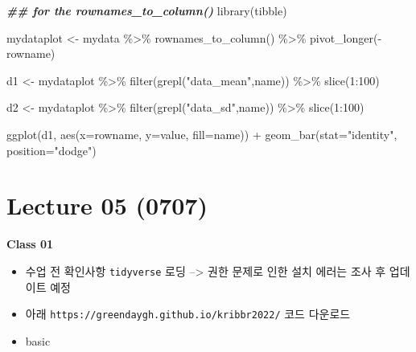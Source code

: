 \documentclass[
]{book}
\newenvironment{Shaded}{\begin{snugshade}}{\end{snugshade}}
\newcommand{\AttributeTok}[1]{\textcolor[rgb]{0.77,0.63,0.00}{#1}}
\newcommand{\DecValTok}[1]{\textcolor[rgb]{0.00,0.00,0.81}{#1}}
\newcommand{\DocumentationTok}[1]{\textcolor[rgb]{0.56,0.35,0.01}{\textbf{\textit{#1}}}}
\newcommand{\FunctionTok}[1]{\textcolor[rgb]{0.00,0.00,0.00}{#1}}
\newcommand{\NormalTok}[1]{#1}
\newcommand{\OtherTok}[1]{\textcolor[rgb]{0.56,0.35,0.01}{#1}}
\newcommand{\SpecialCharTok}[1]{\textcolor[rgb]{0.00,0.00,0.00}{#1}}
\newcommand{\StringTok}[1]{\textcolor[rgb]{0.31,0.60,0.02}{#1}}
\providecommand{\tightlist}{%
  \setlength{\itemsep}{0pt}\setlength{\parskip}{0pt}}
\begin{document}
\begin{Shaded}
\begin{Highlighting}[]
\DocumentationTok{\#\# for the rownames\_to\_column()}
\FunctionTok{library}\NormalTok{(tibble)}

\NormalTok{mydataplot }\OtherTok{\textless{}{-}}\NormalTok{ mydata }\SpecialCharTok{\%\textgreater{}\%} 
  \FunctionTok{rownames\_to\_column}\NormalTok{() }\SpecialCharTok{\%\textgreater{}\%} 
  \FunctionTok{pivot\_longer}\NormalTok{(}\SpecialCharTok{{-}}\NormalTok{rowname)}
  
\NormalTok{d1 }\OtherTok{\textless{}{-}}\NormalTok{ mydataplot }\SpecialCharTok{\%\textgreater{}\%} 
  \FunctionTok{filter}\NormalTok{(}\FunctionTok{grepl}\NormalTok{(}\StringTok{"data\_mean"}\NormalTok{,name)) }\SpecialCharTok{\%\textgreater{}\%} 
  \FunctionTok{slice}\NormalTok{(}\DecValTok{1}\SpecialCharTok{:}\DecValTok{100}\NormalTok{) }

\NormalTok{d2 }\OtherTok{\textless{}{-}}\NormalTok{ mydataplot }\SpecialCharTok{\%\textgreater{}\%} 
  \FunctionTok{filter}\NormalTok{(}\FunctionTok{grepl}\NormalTok{(}\StringTok{"data\_sd"}\NormalTok{,name)) }\SpecialCharTok{\%\textgreater{}\%} 
  \FunctionTok{slice}\NormalTok{(}\DecValTok{1}\SpecialCharTok{:}\DecValTok{100}\NormalTok{) }

\FunctionTok{ggplot}\NormalTok{(d1, }\FunctionTok{aes}\NormalTok{(}\AttributeTok{x=}\NormalTok{rowname, }\AttributeTok{y=}\NormalTok{value, }\AttributeTok{fill=}\NormalTok{name)) }\SpecialCharTok{+}
    \FunctionTok{geom\_bar}\NormalTok{(}\AttributeTok{stat=}\StringTok{"identity"}\NormalTok{, }\AttributeTok{position=}\StringTok{"dodge"}\NormalTok{) }
  
\end{Highlighting}
\end{Shaded}

\hypertarget{lecture-05-0707}{%
\section{Lecture 05 (0707)}\label{lecture-05-0707}}

\textbf{Class 01}

\begin{itemize}
\tightlist
\item
  수업 전 확인사항 \texttt{tidyverse} 로딩 --\textgreater{} 권한 문제로 인한 설치 에러는 조사 후 업데이트 예정
\item
  아래 \texttt{https://greendaygh.github.io/kribbr2022/} 코드 다운로드
\item
  basic
\end{itemize}
\end{document}
